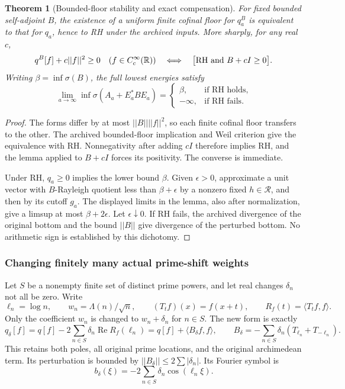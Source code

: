 \documentclass[11pt]{article}
\def\norm#1{||#1||}%
\newtheorem{theorem}{Theorem}[section]
\theoremstyle{remark}
\newcommand{\norm}[1]{\left\lVert #1\right\rVert}
\begin{document}
\begin{theorem}[Bounded-floor stability and exact compensation]\label{thm:ns57-bounded-floor-stability}
For fixed bounded self-adjoint $B$, the existence of a uniform finite
cofinal floor for $q_a^B$ is equivalent to that for $q_a$, hence to RH
under the archived inputs. More sharply, for any real $c$,
\[
 q^B[f]+c\norm f^2\ge0\quad(f\in C_c^\infty(\mathbb R))
 \quad\Longleftrightarrow\quad
 \bigl[\mathrm{RH}\ \hbox{and}\ B+cI\ge0\bigr].
\]
Writing $\beta=\inf\sigma(B)$, the full lowest energies satisfy
\[
 \lim_{a\to\infty}\inf\sigma(A_a+E_a^*BE_a)
 =\begin{cases}\beta,&\text{if RH holds},\\-\infty,&\text{if RH fails}.
 \end{cases}
\]
\end{theorem}
\begin{proof}
The forms differ by at most $\norm B\norm f^2$, so each finite
cofinal floor transfers to the other. The archived bounded-floor
implication and Weil criterion give the equivalence with RH.
Nonnegativity after adding $cI$ therefore implies RH, and the lemma
applied to $B+cI$ forces its positivity. The converse is immediate.

Under RH, $q_a\ge0$ implies the lower bound $\beta$. Given
$\epsilon>0$, approximate a unit vector with $B$-Rayleigh quotient
less than $\beta+\epsilon$ by a nonzero fixed $h\in\mathcal R$,
and then by its cutoff $g_a$. The displayed limits in the lemma,
also after normalization, give a limsup at most $\beta+2\epsilon$.
Let $\epsilon\downarrow0$. If RH fails, the archived divergence
of the original bottom and the bound $\norm B$ give divergence
of the perturbed bottom. No arithmetic sign is established by this dichotomy.
\end{proof}

\subsubsection*{Changing finitely many actual prime-shift weights}
Let $S$ be a nonempty finite set of distinct prime powers, and let
real changes $\delta_n$ not all be zero. Write
\[
 \ell_n=\log n,\qquad w_n=\Lambda(n)/\sqrt n,\qquad
 (T_tf)(x)=f(x+t),\qquad R_f(t)=\langle T_tf,f\rangle.
\]
Only the coefficient $w_n$ is changed to $w_n+\delta_n$ for $n\in S$.
The new form is exactly
\[
 q_\delta[f]=q[f]-2\sum_{n\in S}\delta_n\operatorname{Re}R_f(\ell_n)
            =q[f]+\langle B_\delta f,f\rangle,
 \qquad B_\delta=-\sum_{n\in S}\delta_n(T_{\ell_n}+T_{-\ell_n}).
\]
This retains both poles, all original prime locations, and the original
archimedean term. Its perturbation is bounded by
$\norm{B_\delta}\le2\sum|\delta_n|$. Its Fourier symbol is
\[
 b_\delta(\xi)=-2\sum_{n\in S}\delta_n\cos(\ell_n\xi).
\]
\end{document}
